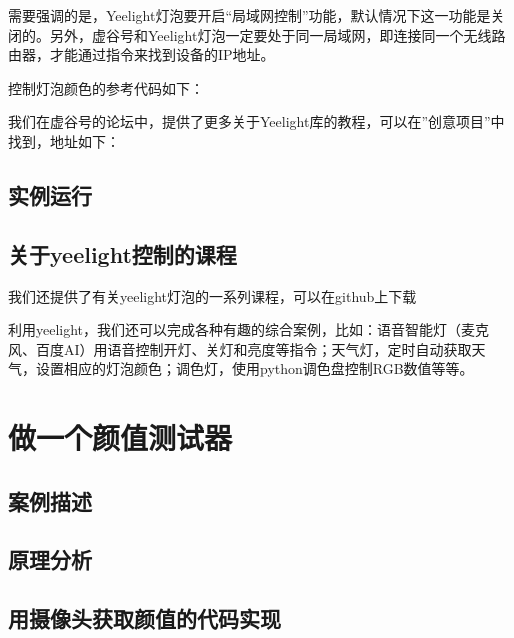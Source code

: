 \documentclass[letterpaper,10pt,english]{sphinxmanual}
\begin{document}
需要强调的是，Yeelight灯泡要开启“局域网控制”功能，默认情况下这一功能是关闭的。另外，虚谷号和Yeelight灯泡一定要处于同一局域网，即连接同一个无线路由器，才能通过指令来找到设备的IP地址。

控制灯泡颜色的参考代码如下：

\noindent{}

我们在虚谷号的论坛中，提供了更多关于Yeelight库的教程，可以在”创意项目”中找到，地址如下：


\subsection{实例运行}
\label{\detokenize{09.case/9.1-yeelight:id7}}
\noindent{}


\subsection{关于yeelight控制的课程}
\label{\detokenize{09.case/9.1-yeelight:id8}}
我们还提供了有关yeelight灯泡的一系列课程，可以在github上下载


利用yeelight，我们还可以完成各种有趣的综合案例，比如：语音智能灯（麦克风、百度AI）用语音控制开灯、关灯和亮度等指令；天气灯，定时自动获取天气，设置相应的灯泡颜色；调色灯，使用python调色盘控制RGB数值等等。


\section{做一个颜值测试器}
\label{\detokenize{09.case/9.2-facetest:id1}}\label{\detokenize{09.case/9.2-facetest::doc}}

\subsection{案例描述}
\label{\detokenize{09.case/9.2-facetest:id2}}

\subsection{原理分析}
\label{\detokenize{09.case/9.2-facetest:id3}}

\subsection{用摄像头获取颜值的代码实现}
\label{\detokenize{09.case/9.2-facetest:id4}}


\renewcommand{\indexname}{Index}
\printindex
\end{document}
